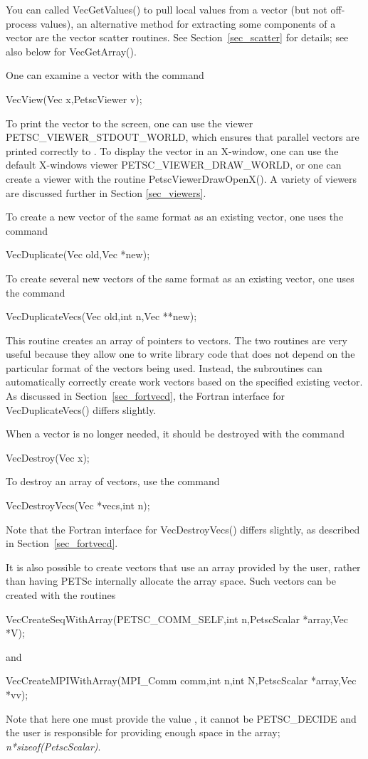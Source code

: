 You can called VecGetValues() to pull local values from a vector (but
not off-process values),
an alternative method for extracting some components of a vector are
the vector scatter routines.  See Section~\ref{sec_scatter} for details; see also
below for VecGetArray().

One can examine a vector with the command
\begin{tabbing}
  VecView(Vec x,PetscViewer v);
\end{tabbing}
To print the vector to the screen, one can use the viewer
PETSC_VIEWER_STDOUT_WORLD,
which ensures that parallel vectors are printed correctly to
. To display the vector in an X-window, one can use the
default X-windows viewer PETSC_VIEWER_DRAW_WORLD,
or one can create a viewer with the
routine PetscViewerDrawOpenX().  A variety of viewers are discussed
further in Section \ref{sec_viewers}.

To create a new vector of the same format as an existing vector, one uses
the command 
\begin{tabbing}
  VecDuplicate(Vec old,Vec *new);
\end{tabbing}
To create several new vectors of the same format as an existing vector,
one uses the command 
\begin{tabbing}
  VecDuplicateVecs(Vec old,int n,Vec **new);
\end{tabbing}
This routine creates an array of pointers to vectors. The two routines 
are very useful because they allow one to write library code that does 
not depend on the particular format of the vectors being used. Instead,
the subroutines can automatically correctly create work vectors
based on the specified existing vector.  As discussed in 
Section~\ref{sec_fortvecd}, the Fortran interface for VecDuplicateVecs()
differs slightly.

When a vector is no longer needed, it should be destroyed with the 
command 
\begin{tabbing}
  VecDestroy(Vec x);
\end{tabbing}
To destroy an array of vectors, use the command 
\begin{tabbing}
  VecDestroyVecs(Vec *vecs,int n);
\end{tabbing}
Note that the Fortran interface for VecDestroyVecs() differs slightly,
as described in Section~\ref{sec_fortvecd}.

It is also possible to create vectors that use an array provided by the user, 
rather than having PETSc internally allocate the array space. 
Such vectors can be created with the routines
\begin{tabbing}
  VecCreateSeqWithArray(PETSC_COMM_SELF,int n,PetscScalar *array,Vec *V);
\end{tabbing}
and  
\begin{tabbing}
  VecCreateMPIWithArray(MPI\_Comm comm,int n,int N,PetscScalar *array,Vec *vv);
\end{tabbing}
Note that here one must provide the value , it cannot be PETSC_DECIDE and
the user is responsible for providing enough space in the array; {\em n*sizeof(PetscScalar)}.


